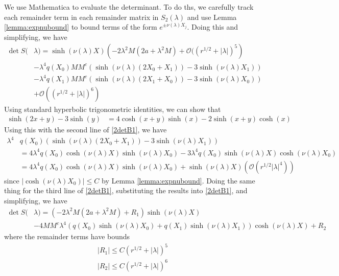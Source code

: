 \documentclass[thesis.tex]{subfiles}
\begin{document}
We use Mathematica to evaluate the determinant. To do ths, we carefully track each remainder term in each remainder matrix in $S_2(\lambda)$ and use Lemma \ref{lemma:expnubound} to bound terms of the form $e^{\pm \nu(\lambda)X_j}$. Doing this and simplifying, we have
\begin{equation}\label{2detB1}
\begin{aligned}
\det S(&\lambda) = \sinh(\nu(\lambda)X)\left(-2 \lambda^2 M (2a + \lambda^2 M) +  \mathcal{O}( (r^{1/2} + |\lambda|)^5 \right) \\
&-\lambda^4 q(X_0) M M^c \left( \sinh(\nu(\lambda)(2 X_0 + X_1)) - 3 \sinh(\nu(\lambda)X_1)  \right) \\
&-\lambda^4 q(X_1) M M^c \left( \sinh(\nu(\lambda)(2 X_1 + X_0)) - 3 \sinh(\nu(\lambda)X_0)  \right) \\
&+ \mathcal{O}( (r^{1/2} + |\lambda|)^6) 
\end{aligned}
\end{equation}
Using standard hyperbolic trigonometric identities, we can show that 
\begin{align*}
\sinh(2 x + y) - 3 \sinh(y) &= 4 \cosh(x + y)\sinh(x) 
-2 \sinh(x+y)\cosh(x) 
\end{align*}
Using this with the second line of \cref{2detB1}, we have
\begin{align*}
\lambda^4 &q(X_0) \left( \sinh(\nu(\lambda)(2 X_0 + X_1)) - 3 \sinh(\nu(\lambda)X_1)  \right) \\
&= 4 \lambda^4 q(X_0) \cosh(\nu(\lambda)X)\sinh(\nu(\lambda)X_0) - 3 \lambda^4 q(X_0) \sinh(\nu(\lambda)X)\cosh(\nu(\lambda)X_0) \\
&= 4 \lambda^4 q(X_0) \cosh(\nu(\lambda)X)\sinh(\nu(\lambda)X_0) + \sinh(\nu(\lambda)X)(\mathcal{O}(r^{1/2}|\lambda|^4))
\end{align*}
since $|\cosh(\nu(\lambda)X_0)|\leq C$ by Lemma \ref{lemma:expnubound}. Doing the same thing for the third line of \cref{2detB1}, substituting the results into \cref{2detB1}, and simplifying, we have
\begin{equation}\label{2pdetSlambda}
\begin{aligned}
\det S(&\lambda) = \left(-2 \lambda^2 M (2a + \lambda^2 M) + R_1  \right) \sinh(\nu(\lambda)X) \\
&-4 M M^c \lambda^4 ( q(X_0) \sinh(\nu(\lambda)X_0) + q(X_1) \sinh(\nu(\lambda)X_1) ) \cosh(\nu(\lambda)X)  + R_2
\end{aligned}
\end{equation}
where the remainder terms have bounds
\begin{align*}
|R_1| \leq C(r^{1/2} + |\lambda|)^5 \\
|R_2| \leq C(r^{1/2} + |\lambda|)^6
\end{align*}
\end{document}
